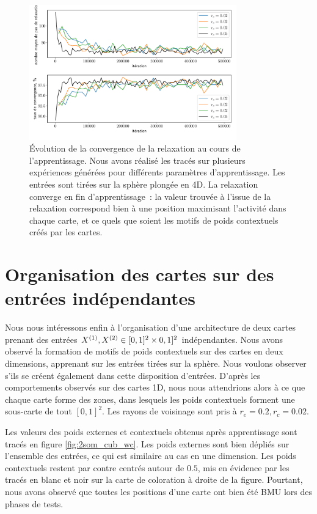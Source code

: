 \documentclass[../main]{subfiles}
\begin{document}
\begin{figure}
	\centering
	\includegraphics[width=0.8\textwidth]{conv_relax_2maps.pdf}
	\vspace{-0.5cm}
	\caption{\'Evolution de la convergence de la relaxation au cours de l'apprentissage. Nous avons réalisé les tracés sur plusieurs expériences générées pour différents paramètres d'apprentissage. Les entrées sont tirées sur la sphère plongée en 4D. 
	La relaxation converge en fin d'apprentissage~: la valeur trouvée à l'issue de la relaxation correspond bien à une position maximisant l'activité dans chaque carte, et ce quels que soient les motifs de poids contextuels créés par les cartes. \label{fig:relax2D}}
\end{figure}

\section{Organisation des cartes sur des entrées indépendantes \label{par:cub2D}}

Nous nous intéressons enfin à l'organisation d'une architecture de deux cartes prenant des entrées $X^{({1})}, X^{({2})} \in [0,1]^2 \times 0,1]^2$ indépendantes.
Nous avons observé la formation de motifs de poids contextuels sur des cartes en deux dimensions, apprenant sur les entrées tirées sur la sphère. Nous voulons observer s'ils se créent également dans cette disposition d'entrées. 
D'après les comportements observés sur des cartes 1D, nous nous attendrions alors à ce que chaque carte forme des zones, dans lesquels les poids contextuels forment une sous-carte de tout $[0,1]^2$.
Les rayons de voisinage sont pris à $r_e = 0.2, r_c = 0.02$.

Les valeurs des poids externes et contextuels obtenus après apprentissage sont tracés en figure \ref{fig:2som_cub_wc}.
Les poids externes sont bien dépliés sur l'ensemble des entrées, ce qui est similaire au cas en une dimension.
Les poids contextuels restent par contre centrés autour de $0.5$, mis en évidence par les tracés en blanc et noir sur la carte de coloration à droite de la figure.
Pourtant, nous avons observé que toutes les positions d'une carte ont bien été BMU lors des phases de tests.
\end{document}

